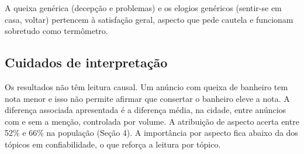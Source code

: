 A queixa genérica (decepção e problemas) e os elogios genéricos (sentir-se em casa, voltar) pertencem à satisfação geral, aspecto que pede cautela e funcionam sobretudo como termômetro.

\subsection{Cuidados de interpretação}

Os resultados não têm leitura causal. Um anúncio com queixa de banheiro tem nota menor e isso não permite afirmar que consertar o banheiro eleve a nota. A diferença associada apresentada é a diferença média, na cidade, entre anúncios com e sem a menção, controlada por volume. A atribuição de aspecto acerta entre 52\% e 66\% na população (Seção 4). A importância por aspecto fica abaixo da dos tópicos em confiabilidade, o que reforça a leitura por tópico.
